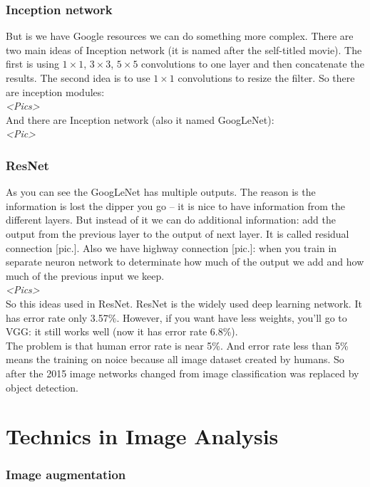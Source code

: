 \subsubsection*{Inception network}

But is we have Google resources we can do something more complex. There are two main ideas of Inception network (it is named after the self-titled movie). The first is using $1\times1$, $3\times3$, $5\times5$ convolutions to one layer and then concatenate the results. The second idea is to use $1\times1$ convolutions to resize the filter. So there are inception modules:\\
{\it <Pics>}\\
And there are Inception network (also it named GoogLeNet):\\
{\it <Pic>}

\subsubsection*{ResNet}

As you can see the GoogLeNet has multiple outputs. The reason is the information is lost the dipper you go -- it is nice to have information from the different layers. But instead of it we can do additional information: add the output from the previous layer to the output of next layer. It is called residual connection [pic.]. Also we have highway connection [pic.]: when you train in separate neuron network to determinate how much of the output we add and how much of the previous input we keep.\\
{\it <Pics>}\\
So this ideas used in ResNet. ResNet is the widely used deep learning network. It has error rate only 3.57\%. However, if you want have less weights, you'll go to VGG: it still works well (now it has error rate 6.8\%).\\
The problem is that human error rate is near 5\%. And error rate less than 5\% means the training on noice because all image dataset created by humans. So after the 2015 image networks changed from image classification was replaced by object detection.

\section{Technics in Image Analysis}
\vspace{-0.6cm}
\subsubsection*{Image augmentation}

